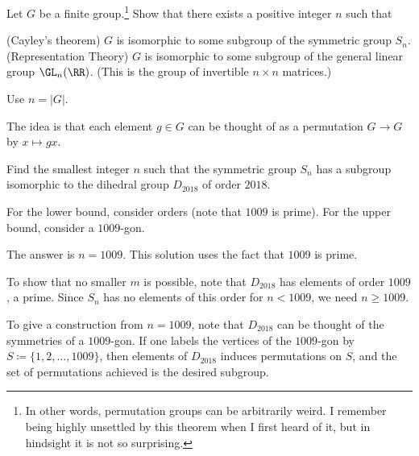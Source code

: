 \begin{dproblem}
	\onechili
	Let $G$ be a finite group.\footnote{In other words,
		permutation groups can be arbitrarily weird.
		I remember being highly unsettled by this theorem when I first heard of it,
		but in hindsight it is not so surprising.}
	Show that there exists a positive integer $n$ such that
	\begin{enumerate}[(a)]
		\ii (Cayley's theorem) $G$ is isomorphic to some subgroup of the symmetric group $S_n$.
		\ii (Representation Theory) $G$ is isomorphic to some subgroup of
		the general linear group $\GL_n(\RR)$.
		(This is the group of invertible $n \times n$ matrices.)
	\end{enumerate}
	\label{thm:cayley_theorem}
	\begin{hint}
		Use $n = \left\lvert G \right\rvert$.
	\end{hint}
	\begin{sol}
		The idea is that each element $g \in G$ can be thought of as a permutation
		$G \to G$ by $x \mapsto gx$.
	\end{sol}
\end{dproblem}

\begin{problem}
	\onechili
	Find the smallest integer $n$
	such that the symmetric group $S_n$ has a subgroup
	isomorphic to the dihedral group $D_{2018}$ of order $2018$.
	\begin{hint}
		For the lower bound, consider orders (note that $1009$ is prime).
		For the upper bound, consider a $1009$-gon.
	\end{hint}
	\begin{sol}
		The answer is $n = 1009$.
		This solution uses the fact that $1009$ is prime.

		To show that no smaller $m$ is possible,
		note that $D_{2018}$ has elements of order $1009$, a prime.
		Since $S_n$ has no elements of this order for $n < 1009$, we need $n \ge 1009$.

		To give a construction from $n = 1009$,
		note that $D_{2018}$ can be thought of the symmetries of a $1009$-gon.
		If one labels the vertices of the $1009$-gon by $S \coloneqq \{1,2,\dots,1009\}$,
		then elements of $D_{2018}$ induces permutations on $S$,
		and the set of permutations achieved is the desired subgroup.
	\end{sol}
\end{problem}

